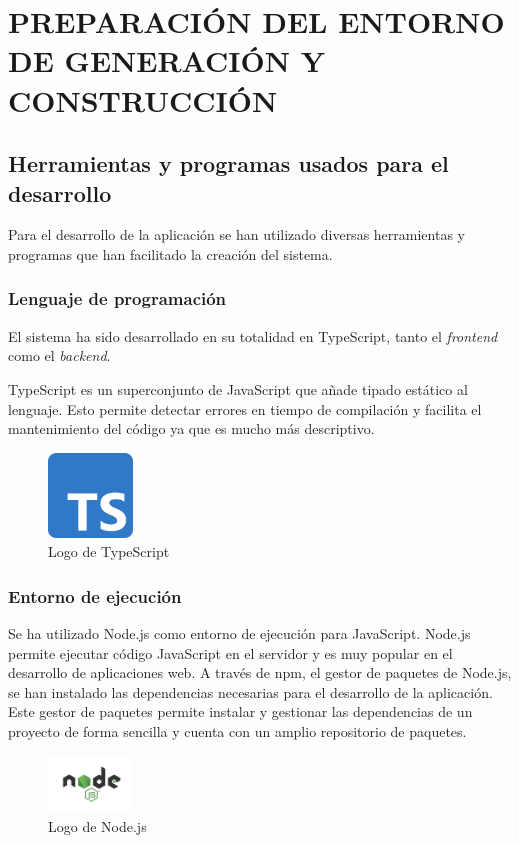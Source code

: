 
\section{PREPARACIÓN DEL ENTORNO DE GENERACIÓN Y CONSTRUCCIÓN}

\subsection{Herramientas y programas usados para el desarrollo}
Para el desarrollo de la aplicación se han utilizado diversas herramientas y programas que han facilitado la creación del sistema.  

\subsubsection{Lenguaje de programación}
El sistema ha sido desarrollado en su totalidad en TypeScript\cite{typescript}, tanto el \textit{frontend} como el \textit{backend}. 

TypeScript es un superconjunto de JavaScript que añade tipado estático al lenguaje.
Esto permite detectar errores en tiempo de compilación y facilita el mantenimiento del código ya que es mucho más descriptivo.

\begin{figure}[H]
    \centering
    \includegraphics[width=0.2\textwidth]{figures/7-Construccion/Typescript.png}
    \caption{Logo de TypeScript}
\end{figure}

\subsubsection{Entorno de ejecución}
Se ha utilizado Node.js\cite{nodejs} como entorno de ejecución para JavaScript.
Node.js permite ejecutar código JavaScript en el servidor y es muy popular en el desarrollo de aplicaciones web.
A través de npm, el gestor de paquetes de Node.js, se han instalado las dependencias necesarias para el desarrollo de la aplicación.
Este gestor de paquetes permite instalar y gestionar las dependencias de un proyecto de forma sencilla y cuenta con un amplio repositorio de paquetes.

\begin{figure}[H]
    \centering
    \includegraphics[width=0.2\textwidth]{figures/7-Construccion/Nodejs.jpeg}
    \caption{Logo de Node.js}
\end{figure}


